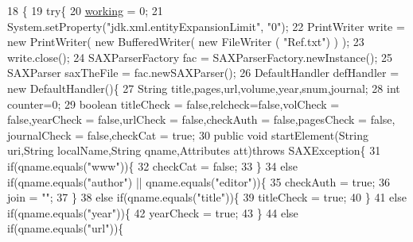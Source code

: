 \begin{DoxyCode}
18                            \{
19         \textcolor{keywordflow}{try}\{
20             \hyperlink{classXmlHandlerTitle_a8430143db4f1036e5db03fbe7e3d451f}{working} = 0;
21             System.setProperty(\textcolor{stringliteral}{"jdk.xml.entityExpansionLimit"}, \textcolor{stringliteral}{"0"});
22             PrintWriter write = \textcolor{keyword}{new} PrintWriter( \textcolor{keyword}{new} BufferedWriter( \textcolor{keyword}{new} FileWriter ( \textcolor{stringliteral}{"Ref.txt"}) ) );
23             write.close();
24             SAXParserFactory fac = SAXParserFactory.newInstance();
25             SAXParser saxTheFile = fac.newSAXParser();
26             DefaultHandler defHandler = \textcolor{keyword}{new} DefaultHandler()\{
27                 String title,pages,url,volume,year,snum,journal;
28                 \textcolor{keywordtype}{int} counter=0;
29                 \textcolor{keywordtype}{boolean} titleCheck = \textcolor{keyword}{false},relcheck=\textcolor{keyword}{false},volCheck = \textcolor{keyword}{false},yearCheck = \textcolor{keyword}{false},urlCheck = \textcolor{keyword}{
      false},checkAuth = \textcolor{keyword}{false},pagesCheck = \textcolor{keyword}{false}, journalCheck = \textcolor{keyword}{false},checkCat = \textcolor{keyword}{true};
30                 \textcolor{keyword}{public} \textcolor{keywordtype}{void} startElement(String uri,String localName,String qname,Attributes att)\textcolor{keywordflow}{throws} 
      SAXException\{
31                     \textcolor{keywordflow}{if}(qname.equals(\textcolor{stringliteral}{"www"}))\{
32                         checkCat = \textcolor{keyword}{false};
33                     \}
34                     \textcolor{keywordflow}{else} \textcolor{keywordflow}{if}(qname.equals(\textcolor{stringliteral}{"author"}) || qname.equals(\textcolor{stringliteral}{"editor"}))\{
35                         checkAuth = \textcolor{keyword}{true};
36                         join = \textcolor{stringliteral}{""};
37                     \}
38                     \textcolor{keywordflow}{else} \textcolor{keywordflow}{if}(qname.equals(\textcolor{stringliteral}{"title"}))\{
39                         titleCheck = \textcolor{keyword}{true};
40                     \}
41                     \textcolor{keywordflow}{else} \textcolor{keywordflow}{if}(qname.equals(\textcolor{stringliteral}{"year"}))\{
42                         yearCheck = \textcolor{keyword}{true};
43                     \}
44                     \textcolor{keywordflow}{else} \textcolor{keywordflow}{if}(qname.equals(\textcolor{stringliteral}{"url"}))\{

\end{DoxyCode}
